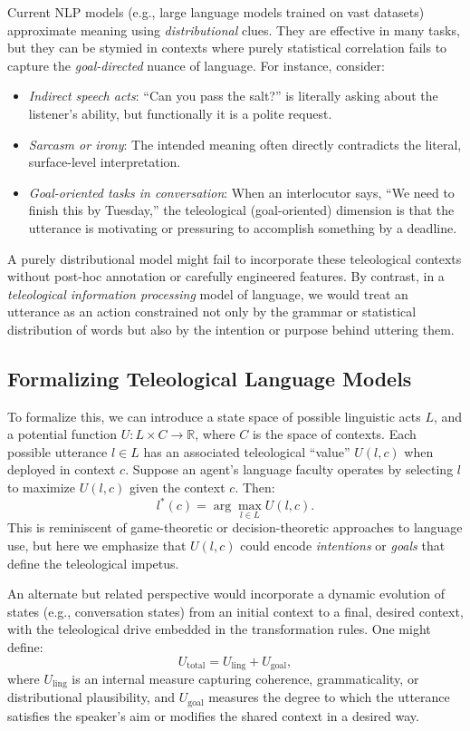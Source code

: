 \documentclass[11pt]{article}
\begin{document}
Current NLP models (e.g., large language models trained on vast datasets) approximate meaning using \emph{distributional} clues. They are effective in many tasks, but they can be stymied in contexts where purely statistical correlation fails to capture the \emph{goal-directed} nuance of language. For instance, consider:
\begin{itemize}
    \item \emph{Indirect speech acts}: “Can you pass the salt?” is literally asking about the listener’s ability, but functionally it is a polite request.
    \item \emph{Sarcasm or irony}: The intended meaning often directly contradicts the literal, surface-level interpretation.
    \item \emph{Goal-oriented tasks in conversation}: When an interlocutor says, “We need to finish this by Tuesday,” the teleological (goal-oriented) dimension is that the utterance is motivating or pressuring to accomplish something by a deadline.
\end{itemize}

A purely distributional model might fail to incorporate these teleological contexts without post-hoc annotation or carefully engineered features. By contrast, in a \emph{teleological information processing} model of language, we would treat an utterance as an action constrained not only by the grammar or statistical distribution of words but also by the intention or purpose behind uttering them.

\subsection{Formalizing Teleological Language Models}
To formalize this, we can introduce a state space of possible linguistic acts $L$, and a potential function $U: L \times C \to \mathbb{R}$, where $C$ is the space of contexts. Each possible utterance $l \in L$ has an associated teleological ``value'' $U(l,c)$ when deployed in context $c$. Suppose an agent’s language faculty operates by selecting $l$ to maximize $U(l,c)$ given the context $c$. Then:
\begin{equation}
    l^*(c) = \arg\max_{l \in L} U(l, c).
\end{equation}
This is reminiscent of game-theoretic or decision-theoretic approaches to language use, but here we emphasize that $U(l,c)$ could encode \emph{intentions} or \emph{goals} that define the teleological impetus.

An alternate but related perspective would incorporate a dynamic evolution of states (e.g., conversation states) from an initial context to a final, desired context, with the teleological drive embedded in the transformation rules. One might define:
\begin{equation}
    U_{\mathrm{total}} = U_{\mathrm{ling}} + U_{\mathrm{goal}},
\end{equation}
where $U_{\mathrm{ling}}$ is an internal measure capturing coherence, grammaticality, or distributional plausibility, and $U_{\mathrm{goal}}$ measures the degree to which the utterance satisfies the speaker's aim or modifies the shared context in a desired way.
\end{document}
